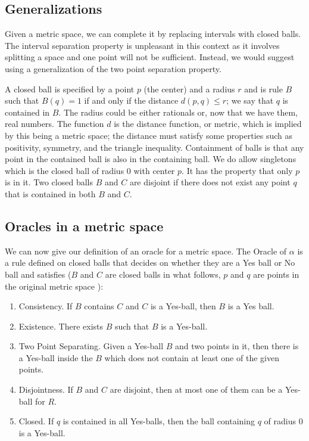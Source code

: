 \documentclass[12pt]{article}
\theoremstyle{remark}
\begin{document}
\subsection{Generalizations}

Given a metric space, we can complete it by replacing intervals with closed balls. The interval separation property is unpleasant in this context as it involves splitting a space and one point will not be sufficient. Instead, we would suggest using a generalization of the two point separation property. 

A closed ball is specified by a point $p$ (the center) and a radius $r$ and is rule $B$ such that $B(q) = 1$ if and only if the distance $d(p,q) \leq r$; we say that $q$ is contained in $B$. The radius could be either rationals or, now that we have them, real numbers. The function $d$ is the distance function, or metric, which is implied by this being a metric space; the distance must satisfy some properties such as positivity, symmetry, and the triangle inequality. Containment of balls is that any point in the contained ball is also in the containing ball. We do allow singletons which is the closed ball of radius $0$ with center $p$. It has the property that only $p$ is in it. Two closed balls $B$ and $C$ are disjoint if there does not exist any point $q$ that is contained in both $B$ and $C$.

\subsection{Oracles in a metric space}

We can now give our definition of an oracle for a metric space. The Oracle of $\alpha$ is a rule defined on closed balls that decides on whether they are a Yes ball or No ball and satisfies ($B$ and $C$ are closed balls in what follows, $p$ and $q$ are points in the original metric space ): 
\begin{enumerate}
    \item Consistency. If $B$ contains $C$ and $C$ is a Yes-ball, then $B$ is a Yes ball.
    \item Existence. There exists $B$ such that $B$ is a Yes-ball.
    \item Two Point Separating. Given a Yes-ball $B$ and two points in it, then there is a Yes-ball inside the $B$ which does not contain at least one of the given points. 
    \item Disjointness. If $B$ and $C$ are disjoint, then at most one of them can be a Yes-ball for $R$.
    \item Closed. If $q$ is contained in all Yes-balls, then the ball containing $q$ of radius 0 is a Yes-ball. 
\end{enumerate}
\end{document}
